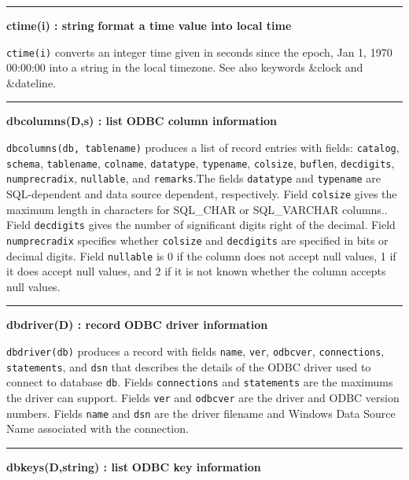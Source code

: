 \bigskip\hrule\vspace{0.1cm}
\noindent
{\bf ctime(i) : string } \hfill {\bf format a time value into local time }

\noindent
{}\texttt{ctime(i)} converts an integer time
given in seconds since the epoch, Jan 1, 1970 00:00:00 into a string in
the local timezone. See also keywords \&clock and \&dateline.

\bigskip\hrule\vspace{0.1cm}
\noindent
{\bf dbcolumns(D,s) : list } \hfill {\bf ODBC column information}

\noindent
{}\texttt{dbcolumns(db, tablename)} produces a list
of record entries with fields:
\texttt{catalog}, \texttt{schema}, \texttt{tablename},
\texttt{colname}, \texttt{datatype}, \texttt{typename}, \texttt{colsize},
\texttt{buflen}, \texttt{decdigits}, \texttt{numprecradix},
\texttt{nullable}, and \texttt{remarks}.The fields
\texttt{datatype} and \texttt{typename} are SQL-dependent and data
source dependent, respectively. Field \texttt{colsize} gives the
maximum length in characters for SQL\_CHAR or SQL\_VARCHAR columns..
Field \texttt{decdigits} gives the number of significant digits right
of the decimal. Field \texttt{numprecradix} specifies whether
\texttt{colsize} and \texttt{decdigits} are specified in bits or
decimal digits. Field \texttt{nullable} is 0 if the column does not
accept null values, 1 if it does accept null values, and 2 if it is not
known whether the column accepts null values.

\bigskip\hrule\vspace{0.1cm}
\noindent
{\bf dbdriver(D) : record } \hfill {\bf ODBC driver information}

\noindent
{}\texttt{dbdriver(db)} produces a record with fields
\texttt{name}, \texttt{ver}, \texttt{odbcver}, \texttt{connections},
\texttt{statements}, and \texttt{dsn} that describes the details of
the ODBC driver used to connect to database \texttt{db}.
Fields \texttt{connections} and \texttt{statements} are the maximums
the driver can support. Fields
\texttt{ver} and \texttt{odbcver} are the driver and ODBC version
numbers. Fields \texttt{name} and \texttt{dsn} are the driver filename
and Windows Data Source Name associated with the connection.

\bigskip\hrule\vspace{0.1cm}
\noindent
{\bf dbkeys(D,string) : list } \hfill {\bf ODBC key information}

